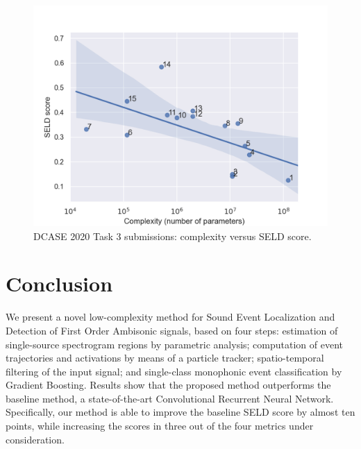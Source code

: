 \begin{figure}[t]
  \centering
  \centerline{\includegraphics[width=\columnwidth]{Figures/SELD/seld_complexity_v4.png}}
  \caption{DCASE 2020 Task 3 submissions: complexity versus SELD score.}
  \label{fig:importance}
\end{figure}



\section{Conclusion}
\label{sec:results}


We present a novel low-complexity method for Sound Event Localization and Detection of First Order Ambisonic signals, based on four steps: estimation of single-source spectrogram regions by parametric analysis; computation of event trajectories and activations by means of a particle tracker; spatio-temporal filtering of the input signal; and single-class monophonic event classification by Gradient Boosting. 
Results show that the proposed method outperforms the baseline method, a state-of-the-art Convolutional Recurrent Neural Network. Specifically, our method is able to improve the baseline SELD score by almost ten points, while increasing the scores in three out of the four metrics under consideration.
